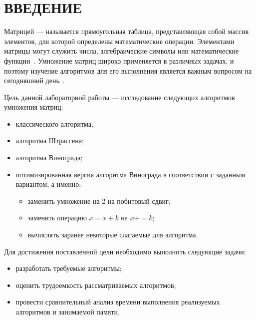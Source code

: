 \chapter*{ВВЕДЕНИЕ}

Матрицей --- называется прямоугольная таблица, представляющая собой массив элементов, для которой определены математические операции. 
Элементами матрицы могут служить числа, алгебраические символы или математические функции~\cite{matrix}. 
Умножение матриц широко применяется в различных задачах, и поэтому изучение алгоритмов для его выполнения является важным вопросом на сегодняшний день~\cite{matrix_in}.

Цель данной лабораторной работы --- исследование следующих алгоритмов умножения матриц:

\begin{itemize}
	\item классического алгоритма;
	\item алгоритма Штрассена;
	\item алгоритма Винограда;
	\item оптимизированная версия алгоритма Винограда в соответствии с заданным вариантом, а именно: 
		\begin{itemize}
			\item заменить умножение на 2 на побитовый сдвиг;
			\item заменить операцию $x = x + k$ на $x += k$;
			\item вычислять заранее некоторые слагаемые для алгоритма.
		\end{itemize}
\end{itemize}


Для достижения поставленной цели необходимо выполнить следующие задачи:
\begin{itemize}
	\item разработать требуемые алгоритмы;
	\item оценить трудоемкость рассматриваемых алгоритмов;
	\item провести сравнительный анализ времени выполнения реализуемых алгоритмов и занимаемой памяти.
\end{itemize}
